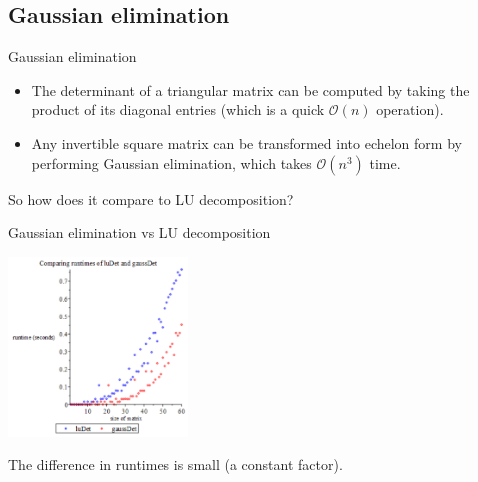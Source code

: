 \documentclass[handout]{beamer}
\begin{document}
\subsection{Gaussian elimination}

\begin{frame}{Gaussian elimination}

    \begin{itemize}

        \item The determinant of a triangular matrix can be computed by taking the product of its
            diagonal entries (which is a quick $\mathcal{O}(n)$ operation).

        \item Any invertible square matrix can be transformed into echelon form by performing
            Gaussian elimination, which takes $\mathcal{O}(n^3)$ time.

    \end{itemize}

    \pause{}

    So how does it compare to LU decomposition?

\end{frame}

\begin{frame}{Gaussian elimination vs LU decomposition}

    \begin{center}{}
        \includegraphics[height=180]{lu-gauss}
    \end{center}

    The difference in runtimes is small (a constant factor).

\end{frame}
\end{document}
